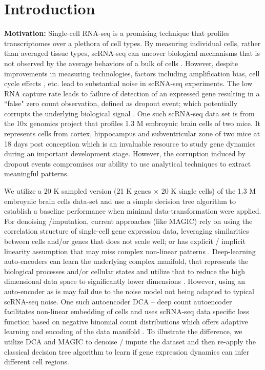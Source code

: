 \section*{Introduction}

\textbf{Motivation:} Single-cell RNA-seq is a promising technique that profiles transcriptomes over a plethora of cell types. By measuring individual cells, rather than averaged tissue types, scRNA-seq can uncover biological mechanisms that is not observed by the average behaviors of a bulk of cells  \citep{wang2017vasc}. However, despite improvements in measuring technologies, factors including amplification bias, cell cycle effects \citep{buettner2015computational}, etc. lead to substantial noise in scRNA-seq experiments. The low RNA capture rate leads to failure of detection of an expressed gene resulting in a ``false" zero count observation, defined as dropout event; which potentially corrupts the underlying biological signal \cite{eraslan2018single}. One such scRNA-seq data set is from the 10x genomics project that profiles 1.3 M embroynic brain cells of two mice. It represents cells from cortex, hippocampus and subventricular zone of two mice at 18 days post conception which is an invaluable resource to study gene dynamics during an important development stage. However, the corruption induced by dropout events compromises our ability to use analytical techniques to extract meaningful patterns. 

We utilize a 20 K sampled version (21 K genes $\times$ 20 K single cells) of the 1.3 M embroynic brain cells data-set and use a simple decision tree algorithm to establish a baseline performance when minimal data-transformation were applied. For denoising /imputation, current approaches (like MAGIC) rely on using the correlation structure of single-cell gene expression data, leveraging similarities between cells and/or genes that does not scale well; or has explicit / implicit linearity assumption that may miss complex non-linear patterns \citep{eraslan2018single}. Deep-learning auto-encoders can learn the underlying complex manifold, that represents the biological processes and/or cellular states and utilize that to reduce the high dimensional data space to significantly lower dimensions \citep{moon2017manifold}. However, using an auto-encoder as is may fail due to the noise model not being adapted to typical scRNA-seq noise. One such autoencoder DCA -- deep count autoencoder facilitates non-linear embedding of cells and uses scRNA-seq data specific loss function based on negative binomial count distributions which offers adaptive learning and encoding of the data manifold \citep{eraslan2018single}. To illustrate the difference, we utilize DCA and MAGIC to denoise / impute the dataset and then re-apply the classical decision tree algorithm to learn if gene expression dynamics can infer different cell regions.

